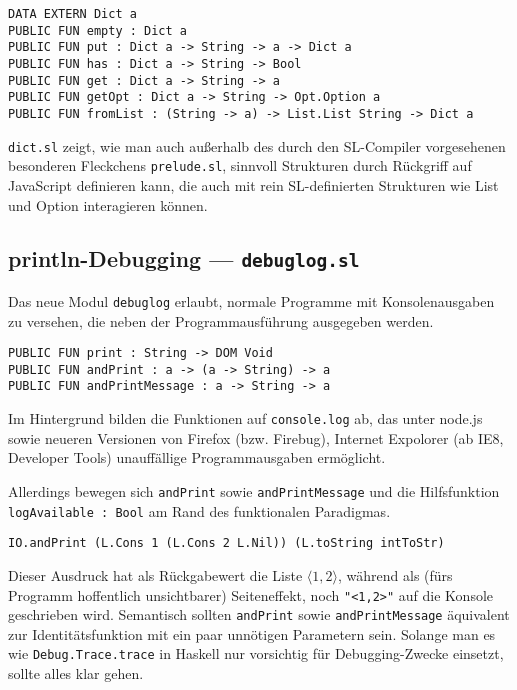 \documentclass[runningheads]{llncs}
\begin{document}
\begin{verbatim}
DATA EXTERN Dict a
PUBLIC FUN empty : Dict a
PUBLIC FUN put : Dict a -> String -> a -> Dict a
PUBLIC FUN has : Dict a -> String -> Bool
PUBLIC FUN get : Dict a -> String -> a
PUBLIC FUN getOpt : Dict a -> String -> Opt.Option a
PUBLIC FUN fromList : (String -> a) -> List.List String -> Dict a
\end{verbatim}

\verb|dict.sl| zeigt, wie man auch außerhalb des durch den SL-Compiler
vorgesehenen besonderen Fleckchens \verb|prelude.sl|, sinnvoll Strukturen
durch Rückgriff auf JavaScript definieren kann, die auch mit rein
SL-definierten Strukturen wie List und Option interagieren können.

\subsection{println-Debugging --- \texttt{debuglog.sl}}

Das neue Modul \verb|debuglog| erlaubt, normale Programme mit Konsolenausgaben
zu versehen, die neben der Programmausführung ausgegeben werden.

\begin{verbatim}
PUBLIC FUN print : String -> DOM Void
PUBLIC FUN andPrint : a -> (a -> String) -> a
PUBLIC FUN andPrintMessage : a -> String -> a
\end{verbatim}

Im Hintergrund bilden die Funktionen auf \verb|console.log| ab, das unter
node.js sowie neueren Versionen von Firefox (bzw. Firebug), Internet Expolorer
(ab IE8, Developer Tools) unauffällige Programmausgaben ermöglicht.

Allerdings bewegen sich \verb|andPrint| sowie \verb|andPrintMessage| und die
Hilfsfunktion \verb|logAvailable : Bool| am Rand des funktionalen Paradigmas.

\begin{verbatim}
IO.andPrint (L.Cons 1 (L.Cons 2 L.Nil)) (L.toString intToStr)
\end{verbatim}

Dieser Ausdruck hat als Rückgabewert die Liste $\langle1,2\rangle$,
während als (fürs Programm hoffentlich unsichtbarer) Seiteneffekt,
noch \verb|"<1,2>"| auf die Konsole geschrieben wird. Semantisch sollten
\verb|andPrint| sowie \verb|andPrintMessage| äquivalent zur Identitätsfunktion
mit ein paar unnötigen Parametern sein. Solange man es wie
\verb|Debug.Trace.trace| in Haskell nur vorsichtig für Debugging-Zwecke
einsetzt, sollte alles klar gehen.
\end{document}
